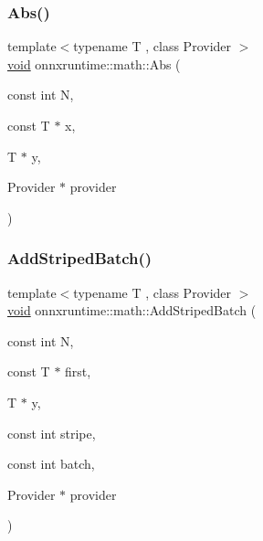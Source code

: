 \subsubsection{\texorpdfstring{Abs()}{Abs()}}
{\footnotesize\ttfamily template$<$typename T , class Provider $>$ \\
\mbox{\hyperlink{mlasi_8h_a88f941d423cb2a819b70a1358982b1a6}{void}} onnxruntime\+::math\+::\+Abs (\begin{DoxyParamCaption}\item[{const int}]{N,  }\item[{const T $\ast$}]{x,  }\item[{T $\ast$}]{y,  }\item[{Provider $\ast$}]{provider }\end{DoxyParamCaption})}

\mbox{\label{namespaceonnxruntime_1_1math_a204b2ced988c7d73477b57d38688a53d}} 
\subsubsection{\texorpdfstring{Add\+Striped\+Batch()}{AddStripedBatch()}}
{\footnotesize\ttfamily template$<$typename T , class Provider $>$ \\
\mbox{\hyperlink{mlasi_8h_a88f941d423cb2a819b70a1358982b1a6}{void}} onnxruntime\+::math\+::\+Add\+Striped\+Batch (\begin{DoxyParamCaption}\item[{const int}]{N,  }\item[{const T $\ast$}]{first,  }\item[{T $\ast$}]{y,  }\item[{const int}]{stripe,  }\item[{const int}]{batch,  }\item[{Provider $\ast$}]{provider }\end{DoxyParamCaption})}

\mbox{\label{namespaceonnxruntime_1_1math_a4600372676aa3433743ff942d3c642a6}} 
